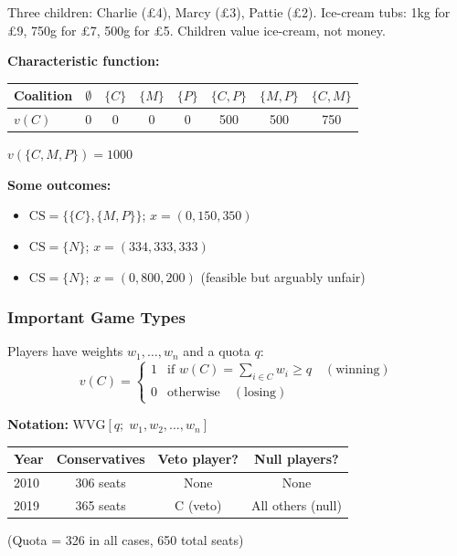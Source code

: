 \begin{exbox}
Three children: Charlie ({\pounds}4), Marcy ({\pounds}3), Pattie ({\pounds}2). Ice-cream tubs: 1kg for {\pounds}9, 750g for {\pounds}7, 500g for {\pounds}5. Children value ice-cream, not money.

\textbf{Characteristic function:}
\begin{center}
\renewcommand{\arraystretch}{1.2}
\begin{tabular}{@{} l c c c c c c c @{}}
\toprule
Coalition & $\emptyset$ & $\{C\}$ & $\{M\}$ & $\{P\}$ & $\{C,P\}$ & $\{M,P\}$ & $\{C,M\}$ \\
\midrule
$v(C)$ & 0 & 0 & 0 & 0 & 500 & 500 & 750 \\
\bottomrule
\end{tabular}
\end{center}
$v(\{C, M, P\}) = 1000$

\textbf{Some outcomes:}
\begin{itemize}
  \item $\text{CS} = \{\{C\}, \{M,P\}\}$; $x = (0, 150, 350)$
  \item $\text{CS} = \{N\}$; $x = (334, 333, 333)$
  \item $\text{CS} = \{N\}$; $x = (0, 800, 200)$ \quad (feasible but arguably unfair)
\end{itemize}
\end{exbox}

\separator

\subsubsection{Important Game Types}

\begin{defbox}
Players have weights $w_1, \ldots, w_n$ and a quota $q$:
\[
v(C) = \begin{cases} 1 & \text{if } w(C) = \sum_{i \in C} w_i \geq q \quad (\text{winning}) \\ 0 & \text{otherwise} \quad (\text{losing}) \end{cases}
\]

\textbf{Notation:} $\text{WVG}[q;\; w_1, w_2, \ldots, w_n]$
\end{defbox}

\begin{exbox}
\begin{center}
\renewcommand{\arraystretch}{1.2}
\begin{tabular}{@{} l c c c @{}}
\toprule
\textbf{Year} & \textbf{Conservatives} & \textbf{Veto player?} & \textbf{Null players?} \\
\midrule
2010 & 306 seats & None & None \\
2019 & 365 seats & C (veto) & All others (null) \\
\bottomrule
\end{tabular}
\end{center}
(Quota = 326 in all cases, 650 total seats)
\end{exbox}

